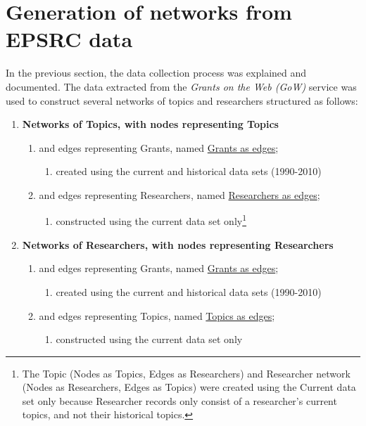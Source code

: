 \section{Generation of networks from EPSRC data}

In the previous section, the data collection process was explained and documented. The data extracted from the \textit{Grants on the Web (GoW)} service was used to construct several networks of topics and researchers structured as follows:

\begin{enumerate}[itemsep=0cm, label*=\arabic*.]
    
    \item \textbf{Networks of Topics, with nodes representing Topics}
    \begin{enumerate}[itemsep=0cm, label*=\arabic*.]
        \item and edges representing Grants, named \underline{Grants as edges};
            \begin{enumerate}[itemsep=0cm, label*=\arabic*.]
                \item created using the current and historical data sets (1990-2010)
            \end{enumerate}
        \item and edges representing Researchers, named \underline{Researchers as edges};
            \begin{enumerate}[itemsep=0cm, label*=\arabic*.]
                \item constructed using the current data set only\footnote{The Topic (Nodes as Topics, Edges as Researchers) and Researcher network (Nodes as Researchers, Edges as Topics) were created using the Current data set only because Researcher records only consist of a researcher's current topics, and not their historical topics.}
            \end{enumerate}
    \end{enumerate}

    \item \textbf{Networks of Researchers, with nodes representing Researchers}
    \begin{enumerate}[itemsep=0cm, label*=\arabic*.]
        \item and edges representing Grants, named \underline{Grants as edges};
        \begin{enumerate}[itemsep=0cm, label*=\arabic*.]
                \item created using the current and historical data sets (1990-2010)
            \end{enumerate}
        \item and edges representing Topics, named \underline{Topics as edges};
        \begin{enumerate}[itemsep=0cm, label*=\arabic*.]
                \item constructed using the current data set only\footnotemark[1]
        \end{enumerate}
    \end{enumerate}

\end{enumerate}

